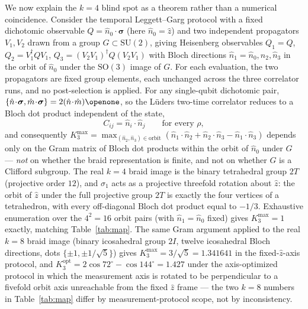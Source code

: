\documentclass[aps,pra,twocolumn,superscriptaddress,longbibliography,floatfix,nofootinbib]{revtex4-2}
\begin{document}
We now explain the $k=4$ blind spot as a theorem rather than a
numerical coincidence. Consider the temporal Leggett--Garg protocol
with a fixed dichotomic observable $Q=\hat n_0\!\cdot\!\bm\sigma$
(here $\hat n_0=\hat z$) and two independent propagators $V_1,V_2$
drawn from a group $G\subset\mathrm{SU}(2)$, giving Heisenberg
observables $Q_1=Q$, $Q_2=V_1^\dagger QV_1$, $Q_3=(V_2V_1)^\dagger
Q(V_2V_1)$ with Bloch directions $\hat n_1=\hat n_0,\hat n_2,\hat
n_3$ in the orbit of $\hat n_0$ under the $\mathrm{SO}(3)$ image of
$G$. For each evaluation, the two propagators are fixed group elements,
each unchanged across the three correlator runs, and no post-selection is
applied. For any single-qubit dichotomic pair,
$\{\hat n\!\cdot\!\bm\sigma,\hat m\!\cdot\!\bm\sigma\}
=2(\hat n\!\cdot\!\hat m)\openone$, so the Lüders two-time
correlator reduces to a Bloch dot product independent of the state,
\begin{equation}
\label{eq:gram}
C_{ij} = \hat n_i\cdot\hat n_j \qquad \text{for every } \rho,
\end{equation}
and consequently
$K_3^{\max}=\max_{(\hat n_2,\hat n_3)\in\text{orbit}}
(\hat n_1\!\cdot\!\hat n_2+\hat n_2\!\cdot\!\hat n_3-\hat n_1\!\cdot\!\hat n_3)$
depends only on the Gram matrix of Bloch dot products within the
orbit of $\hat n_0$ under $G$ --- \emph{not} on whether the braid
representation is finite, and not on whether $G$ is a Clifford
subgroup. The real $k=4$ braid image is the binary tetrahedral group
$2T$ (projective order $12$), and $\sigma_1$ acts as a projective
threefold rotation about $\hat z$: the orbit of $\hat z$ under the
full projective group $2T$ is exactly the four vertices of a
tetrahedron, with every
off-diagonal Bloch dot product equal to $-1/3$. Exhaustive
enumeration over the $4^2=16$ orbit pairs (with $\hat n_1=\hat n_0$
fixed) gives $K_3^{\max}=1$ exactly, matching Table~\ref{tab:map}. The same
Gram argument applied to the real $k=8$ braid image (binary
icosahedral group $2I$, twelve icosahedral Bloch directions, dots
$\{\pm1,\pm1/\sqrt5\}$) gives $K_3^{\max}=3/\sqrt5=1.341641$ in the
fixed-$\hat z$-axis protocol, and $K_3^{\mathrm{opt}}=2\cos72^\circ
-\cos144^\circ=1.427$ under the axis-optimized protocol in which the
measurement axis is rotated to be perpendicular to a fivefold orbit
axis unreachable from the fixed $\hat z$ frame --- the two $k=8$
numbers in Table~\ref{tab:map} differ by measurement-protocol scope,
not by inconsistency.
\end{document}
